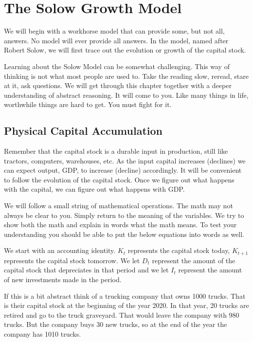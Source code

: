 \documentclass[
]{book}
\begin{document}
\hypertarget{the-solow-growth-model}{%
\section{The Solow Growth Model}\label{the-solow-growth-model}}

We will begin with a workhorse model that can provide some, but not all, answers. No model will ever provide all answers. In the model, named after Robert Solow, we will first trace out the evolution or growth of the capital stock.

Learning about the Solow Model can be somewhat challenging. This way of thinking is not what most people are used to. Take the reading slow, reread, stare at it, ask questions. We will get through this chapter together with a deeper understanding of abstract reasoning. It will come to you. Like many things in life, worthwhile things are hard to get. You must fight for it.

\hypertarget{physical-capital-accumulation}{%
\subsection{Physical Capital Accumulation}\label{physical-capital-accumulation}}

Remember that the capital stock is a durable input in production, still like tractors, computers, warehouses, etc. As the input capital increases (declines) we can expect output, GDP, to increase (decline) accordingly. It will be convenient to follow the evolution of the capital stock. Once we figure out what happens with the capital, we can figure out what happens with GDP.

We will follow a small string of mathematical operations. The math may not always be clear to you. Simply return to the meaning of the variables. We try to show both the math and explain in words what the math means. To test your understanding you should be able to put the below equations into words as well.

We start with an accounting identity. \(K_t\) represents the capital stock today, \(K_{t+1}\) represents the capital stock tomorrow. We let \(D_t\) represent the amount of the capital stock that depreciates in that period and we let \(I_t\) represent the amount of new investments made in the period.

If this is a bit abstract think of a trucking company that owns 1000 trucks. That is their capital stock at the beginning of the year 2020. In that year, 20 trucks are retired and go to the truck graveyard. That would leave the company with 980 trucks. But the company buys 30 new trucks, so at the end of the year the company has 1010 trucks.
\end{document}
